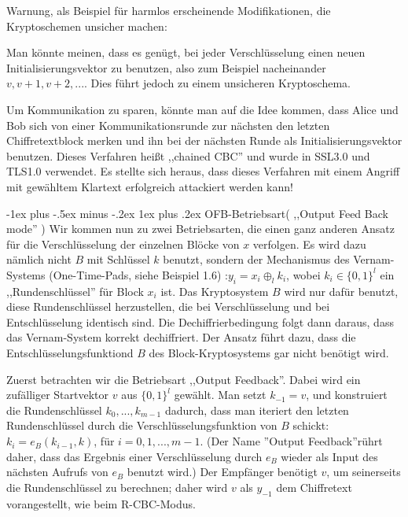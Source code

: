 \documentclass[a4paper]{article}
\makeatletter
\renewcommand{\subsubsection}{\@startsection{subsubsection}{3}{0mm}%
 {-1ex plus -.5ex minus -.2ex}%
 {1ex plus .2ex}%
 {\normalfont\small\bfseries}}
\makeatother
\begin{document}
\begin{multicols}{3}
    Warnung, als Beispiel für harmlos erscheinende Modifikationen, die Kryptoschemen unsicher machen:
    \begin{enumerate*}
        \item Man könnte meinen, dass es genügt, bei jeder Verschlüsselung einen neuen Initialisierungsvektor zu benutzen, also zum Beispiel nacheinander $v,v+1,v+2,...$. Dies führt jedoch zu einem unsicheren Kryptoschema.
        \item Um Kommunikation zu sparen, könnte man auf die Idee kommen, dass Alice und Bob sich von einer Kommunikationsrunde zur nächsten den letzten Chiffretextblock merken und ihn bei der nächsten Runde als Initialisierungsvektor benutzen. Dieses Verfahren heißt ,,chained CBC'' und wurde in SSL3.0 und TLS1.0 verwendet. Es stellte sich heraus, dass dieses Verfahren mit einem Angriff mit gewähltem Klartext erfolgreich attackiert werden kann!
    \end{enumerate*}

    \subsubsection{OFB-Betriebsart( ,,Output Feed Back mode'' )}
    Wir kommen nun zu zwei Betriebsarten, die einen ganz anderen Ansatz für die Verschlüsselung der einzelnen Blöcke von $x$ verfolgen. Es wird dazu nämlich nicht $B$ mit Schlüssel $k$ benutzt, sondern der Mechanismus des Vernam-Systems (One-Time-Pads, siehe Beispiel 1.6) :$y_i=x_i\oplus_l k_i$, wobei $k_i\in\{0,1\}^l$ ein ,,Rundenschlüssel'' für Block $x_i$ ist. Das Kryptosystem $B$ wird nur dafür benutzt, diese Rundenschlüssel herzustellen, die bei Verschlüsselung und bei Entschlüsselung identisch sind. Die Dechiffrierbedingung folgt dann daraus, dass das Vernam-System korrekt dechiffriert. Der Ansatz führt dazu, dass die Entschlüsselungsfunktiond $B$ des Block-Kryptosystems gar nicht benötigt wird.

    Zuerst betrachten wir die Betriebsart ,,Output Feedback''. Dabei wird ein zufälliger Startvektor $v$ aus $\{0,1\}^l$ gewählt. Man setzt $k_{-1}=v$, und konstruiert die Rundenschlüssel $k_0,...,k_{m-1}$ dadurch, dass man iteriert den letzten Rundenschlüssel durch die Verschlüsselungsfunktion von $B$ schickt: $k_i=e_B(k_{i-1}, k)$, für $i=0,1,...,m-1$. (Der Name ''Output Feedback''rührt daher, dass das Ergebnis einer Verschlüsselung durch $e_B$ wieder als Input des nächsten Aufrufs von $e_B$ benutzt wird.) Der Empfänger benötigt $v$, um seinerseits die Rundenschlüssel zu berechnen; daher wird $v$ als $y_{-1}$ dem Chiffretext vorangestellt, wie beim R-CBC-Modus.


\end{multicols}
\end{document}

